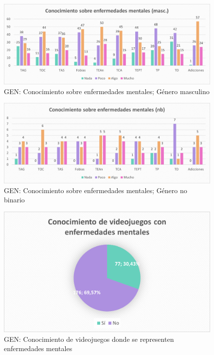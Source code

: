 \documentclass[12pt, a4paper,twoside,titlepage]{book}
\begin{document}
\begin{figure}
    \centering
    \includegraphics[width=1\linewidth]{ANEXO Gen/12AnexGENCongmasc}
    \caption{GEN: Conocimiento sobre enfermedades mentales; Género masculino}
  
\end{figure}
\begin{figure}
    \centering
    \includegraphics[width=1\linewidth]{ANEXO Gen/13AnexGENConnb}
    \caption{GEN: Conocimiento sobre enfermedades mentales; Género no binario}
    
\end{figure}



\begin{figure}
    \centering
    \includegraphics[width=.8\linewidth]{ANEXO Gen/14AnexGENConvid}
    \caption{GEN: Conocimiento de videojuegos donde se representen enfermedades mentales}
     \label{fig:GENVid}
\end{figure}
\end{document}
